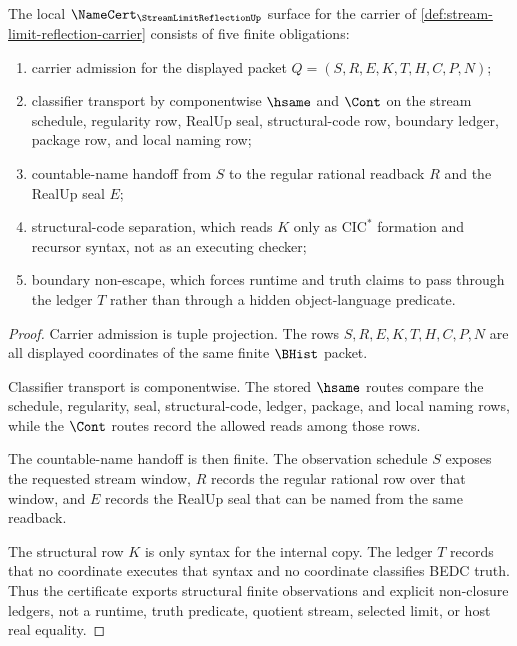 \begin{theorem}
\label{thm:stream-limit-reflection-namecert-obligations}
The local $\NameCert_{\StreamLimitReflectionUp}$ surface for the carrier of \autoref{def:stream-limit-reflection-carrier} consists of five finite obligations:
\begin{enumerate}
\item carrier admission for the displayed packet $Q=(S,R,E,K,T,H,C,P,N)$;
\item classifier transport by componentwise $\hsame$ and $\Cont$ on the stream schedule, regularity row, RealUp seal, structural-code row, boundary ledger, package row, and local naming row;
\item countable-name handoff from $S$ to the regular rational readback $R$ and the RealUp seal $E$;
\item structural-code separation, which reads $K$ only as $\mathrm{CIC}^{*}$ formation and recursor syntax, not as an executing checker;
\item boundary non-escape, which forces runtime and truth claims to pass through the ledger $T$ rather than through a hidden object-language predicate.
\end{enumerate}
\end{theorem}
\begin{proof}
Carrier admission is tuple projection. The rows $S,R,E,K,T,H,C,P,N$ are all displayed coordinates of the same finite $\BHist$ packet.

Classifier transport is componentwise. The stored $\hsame$ routes compare the schedule, regularity, seal, structural-code, ledger, package, and local naming rows, while the $\Cont$ routes record the allowed reads among those rows.

The countable-name handoff is then finite. The observation schedule $S$ exposes the requested stream window, $R$ records the regular rational row over that window, and $E$ records the RealUp seal that can be named from the same readback.

The structural row $K$ is only syntax for the internal copy. The ledger $T$ records that no coordinate executes that syntax and no coordinate classifies BEDC truth. Thus the certificate exports structural finite observations and explicit non-closure ledgers, not a runtime, truth predicate, quotient stream, selected limit, or host real equality.
\end{proof}

